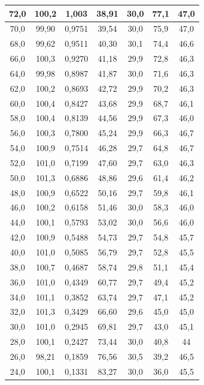 \documentclass[a4paper]{article}
\begin{document}
\begin{longtable}{|c|c|c|c|c|c|c|}
        72,0 & 100,2 & 1,003 & 38,91 & 30,0 & 77,1 & 47,0 \\ \hline
        70,0 & 99,90 & 0,9751 & 39,54 & 30,0 & 75,9 & 47,0 \\ \hline
        68,0 & 99,62 & 0,9511 & 40,30 & 30,1 & 74,4 & 46,6 \\ \hline
        66,0 & 100,3 & 0,9270 & 41,18 & 29,9 & 72,8 & 46,3 \\ \hline
        64,0 & 99,98 & 0,8987 & 41,87 & 30,0 & 71,6 & 46,3 \\ \hline
        62,0 & 100,2 & 0,8693 & 42,72 & 29,9 & 70,2 & 46,3 \\ \hline
        60,0 & 100,4 & 0,8427 & 43,68 & 29,9 & 68,7 & 46,1 \\ \hline
        58,0 & 100,4 & 0,8139 & 44,56 & 29,9 & 67,3 & 46,0 \\ \hline
        56,0 & 100,3 & 0,7800 & 45,24 & 29,9 & 66,3 & 46,7 \\ \hline
        54,0 & 100,9 & 0,7514 & 46,28 & 29,7 & 64,8 & 46,7 \\ \hline
        52,0 & 101,0 & 0,7199 & 47,60 & 29,7 & 63,0 & 46,3 \\ \hline
        50,0 & 101,3 & 0,6886 & 48,86 & 29,6 & 61,4 & 46,2 \\ \hline
        48,0 & 100,9 & 0,6522 & 50,16 & 29,7 & 59,8 & 46,1 \\ \hline
        46,0 & 100,2 & 0,6158 & 51,46 & 30,0 & 58,3 & 46,0 \\ \hline
        44,0 & 100,1 & 0,5793 & 53,02 & 30,0 & 56,6 & 46,0 \\ \hline
        42,0 & 100,9 & 0,5488 & 54,73 & 29,7 & 54,8 & 45,7 \\ \hline
        40,0 & 101,0 & 0,5085 & 56,79 & 29,7 & 52,8 & 45,5 \\ \hline
        38,0 & 100,7 & 0,4687 & 58,74 & 29,8 & 51,1 & 45,4 \\ \hline
        36,0 & 101,0 & 0,4349 & 60,77 & 29,7 & 49,4 & 45,2 \\ \hline
        34,0 & 101,1 & 0,3852 & 63,74 & 29,7 & 47,1 & 45,2 \\ \hline
        32,0 & 101,3 & 0,3429 & 66,60 & 29,6 & 45,0 & 45,0 \\ \hline
        30,0 & 101,0 & 0,2945 & 69,81 & 29,7 & 43,0 & 45,1 \\ \hline
        28,0 & 100,1 & 0,2427 & 73,44 & 30,0 & 40,8 & 44 \\ \hline
        26,0 & 98,21 & 0,1859 & 76,56 & 30,5 & 39,2 & 46,5 \\ \hline
        24,0 & 100,1 & 0,1331 & 83,27 & 30,0 & 36,0 & 45,5  \\ \hline
   
\end{longtable}
\end{document}
